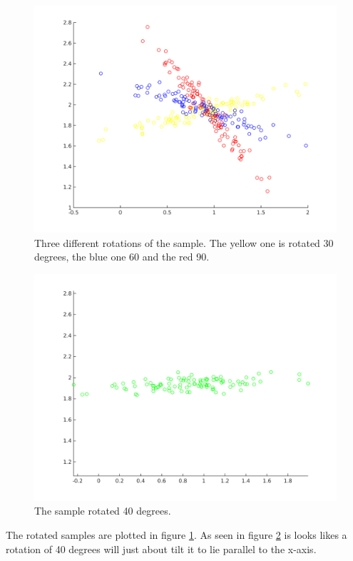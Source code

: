 \documentclass{article}
\begin{document}
\begin{figure}[!ht]
    \centering
    \includegraphics[width=\textwidth]{part1/I241.png}
    \caption{Three different rotations of the sample. The yellow one is
    rotated 30 degrees, the blue one 60 and the red 90.}
    \label{fig:I4.1}
\end{figure}

\begin{figure}[!ht]
    \centering
    \includegraphics[width=\textwidth]{part1/I242.png}
    \caption{The sample rotated 40 degrees.}
    \label{fig:I4.2}
\end{figure}

The rotated samples are plotted in figure \ref{fig:I4.1}. As seen in
figure \ref{fig:I4.2} is looks likes a rotation of 40 degrees will just
about tilt it to lie parallel to the x-axis.
\end{document}

